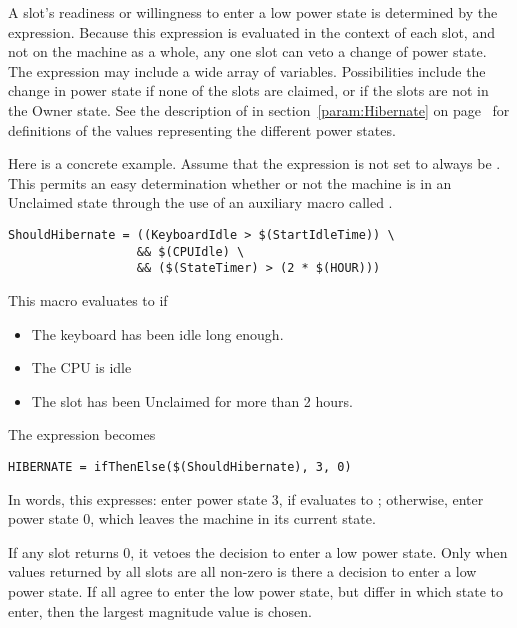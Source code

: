 A slot's readiness or willingness to enter a low power state is 
determined by the  expression. 
Because this expression is evaluated in the context of each slot,
and not on the machine as a whole, 
any one slot can veto a change of power state.  
The  expression may include a wide array of variables.
Possibilities include the change in power state if 
none of the slots are claimed, or if the slots are not in the
Owner state.
See the description of  in
section~\ref{param:Hibernate} on page~\pageref{param:Hibernate}
for definitions of the values representing the different
power states.

Here is a concrete example.
Assume that the  expression is not set to
always be .
This permits an easy determination whether or not
the machine is in an Unclaimed state through the use of
an auxiliary macro called .

\begin{verbatim}
ShouldHibernate = ((KeyboardIdle > $(StartIdleTime)) \
                  && $(CPUIdle) \
                  && ($(StateTimer) > (2 * $(HOUR)))
\end{verbatim}

This macro evaluates to  if
\begin{itemize}
\item The keyboard has been idle long enough.
\item The CPU is idle
\item The slot has been Unclaimed for more than 2 hours.
\end{itemize}

The  expression becomes

\begin{verbatim}
HIBERNATE = ifThenElse($(ShouldHibernate), 3, 0)
\end{verbatim}

In words, this expresses:
enter power state $3$,
if  evaluates to ; 
otherwise, enter power state $0$,
which leaves the machine in its current state. 

If any slot returns $0$, 
it vetoes the decision to enter a low power state.
Only when values returned by all slots are all non-zero 
is there a decision to enter a low power state.
If all agree to enter the low power state, but differ in which state to enter,
then the largest magnitude value is chosen. 


